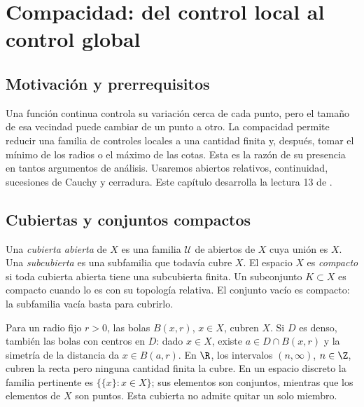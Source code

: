 \chapter{Compacidad: del control local al control global}\label{chap:13}

\section{Motivación y prerrequisitos}
Una función continua controla su variación cerca de cada punto, pero el tamaño de esa vecindad puede cambiar de un punto a otro. La compacidad permite reducir una familia de controles locales a una cantidad finita y, después, tomar el mínimo de los radios o el máximo de las cotas. Esta es la razón de su presencia en tantos argumentos de análisis. Usaremos abiertos relativos, continuidad, sucesiones de Cauchy y cerradura. Este capítulo desarrolla la lectura 13 de \cite{valencia}.

\section{Cubiertas y conjuntos compactos}
\begin{definicion}
Una \emph{cubierta abierta} de $X$ es una familia $\mathcal U$ de abiertos de $X$ cuya unión es $X$. Una \emph{subcubierta} es una subfamilia que todavía cubre $X$. El espacio $X$ es \emph{compacto} si toda cubierta abierta tiene una subcubierta finita. Un subconjunto $K\subset X$ es compacto cuando lo es con su topología relativa. El conjunto vacío es compacto: la subfamilia vacía basta para cubrirlo.
\end{definicion}
Para un radio fijo $r>0$, las bolas $B(x,r)$, $x\in X$, cubren $X$. Si $D$ es denso, también las bolas con centros en $D$: dado $x\in X$, existe $a\in D\cap B(x,r)$ y la simetría de la distancia da $x\in B(a,r)$. En $\R$, los intervalos $(n,\infty)$, $n\in\Z$, cubren la recta pero ninguna cantidad finita la cubre. En un espacio discreto la familia pertinente es $\{\{x\}:x\in X\}$; sus elementos son conjuntos, mientras que los elementos de $X$ son puntos. Esta cubierta no admite quitar un solo miembro.

